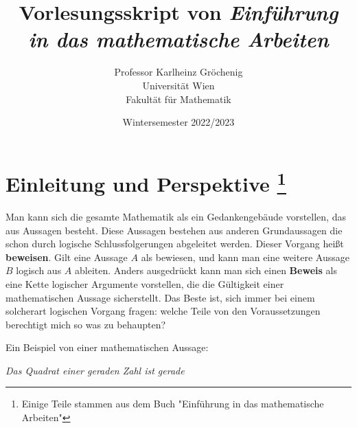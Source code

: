 \documentclass{article}
\theoremstyle{definition}
\theoremstyle{plain}
\begin{document}
	
		\title{Vorlesungsskript von \textit{Einführung in das mathematische Arbeiten}}
		\author{
		Professor Karlheinz Gröchenig \\ Universität Wien \\ Fakultät für Mathematik}
		
		\date{Wintersemester 2022/2023}
\begin{titlepage}
	\maketitle
	\thispagestyle{empty}
\end{titlepage}
\newpage
\section[Einleitung und Perspektive]{Einleitung und Perspektive
	\protect\footnote{Einige Teile stammen aus dem Buch "Einführung in das mathematische Arbeiten"}
}
Man kann sich die gesamte Mathematik als ein Gedankengebäude vorstellen, das aus Aussagen besteht. Diese Aussagen bestehen aus anderen Grundaussagen die schon durch logische Schlussfolgerungen abgeleitet werden. Dieser Vorgang heißt \textbf{beweisen}. Gilt eine Aussage $ A $ als bewiesen, und kann man eine weitere Aussage $ B $ logisch aus $ A $ ableiten. Anders ausgedrückt kann man sich einen \textbf{Beweis} als eine Kette logischer Argumente vorstellen, die die Gültigkeit einer mathematischen Aussage sicherstellt. Das Beste ist, sich immer bei einem solcherart logischen Vorgang fragen: welche Teile von den Voraussetzungen berechtigt mich so was zu behaupten?
  
Ein Beispiel von einer mathematischen Aussage:
\begin{center}
		\textit{Das Quadrat einer geraden Zahl ist gerade}
\end{center}
\end{document}
